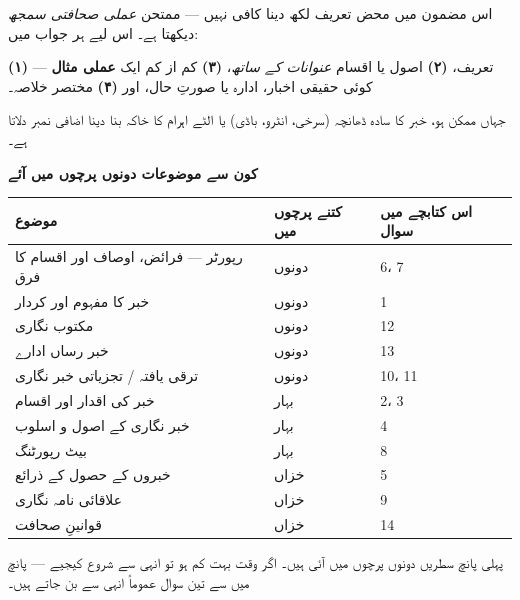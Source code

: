 \medskip
\begin{nukta}
اس مضمون میں محض تعریف لکھ دینا کافی نہیں --- ممتحن \emph{عملی صحافتی سمجھ}
دیکھتا ہے۔ اس لیے ہر جواب میں:

\smallskip
\textbf{(۱)} تعریف، \textbf{(۲)} اصول یا اقسام \emph{عنوانات کے ساتھ}،
\textbf{(۳)} کم از کم ایک \textbf{عملی مثال} --- کوئی حقیقی اخبار، ادارہ یا
صورتِ حال، اور \textbf{(۴)} مختصر خلاصہ۔

\smallskip
جہاں ممکن ہو، خبر کا سادہ ڈھانچہ (سرخی، انٹرو، باڈی) یا الٹے اہرام کا خاکہ بنا
دینا اضافی نمبر دلاتا ہے۔
\end{nukta}

\medskip
\noindent
\textbf{\color{bmblue}کون سے موضوعات دونوں پرچوں میں آئے}

\medskip
\begin{center}
\begin{tabular}{@{}p{6.6cm} p{2.6cm} p{5.2cm}@{}}
\toprule
\textbf{موضوع} & \textbf{کتنے پرچوں میں} & \textbf{اس کتابچے میں سوال} \\
\midrule
رپورٹر --- فرائض، اوصاف اور اقسام کا فرق & دونوں & \textenglish{6}، \textenglish{7} \\
خبر کا مفہوم اور کردار                    & دونوں & \textenglish{1} \\
مکتوب نگاری                                & دونوں & \textenglish{12} \\
خبر رساں ادارے                             & دونوں & \textenglish{13} \\
ترقی یافتہ / تجزیاتی خبر نگاری             & دونوں & \textenglish{10}، \textenglish{11} \\
خبر کی اقدار اور اقسام                     & بہار  & \textenglish{2}، \textenglish{3} \\
خبر نگاری کے اصول و اسلوب                  & بہار  & \textenglish{4} \\
بیٹ رپورٹنگ                                 & بہار  & \textenglish{8} \\
خبروں کے حصول کے ذرائع                     & خزاں  & \textenglish{5} \\
علاقائی نامہ نگاری                          & خزاں  & \textenglish{9} \\
قوانینِ صحافت                               & خزاں  & \textenglish{14} \\
\bottomrule
\end{tabular}
\end{center}

\medskip
\noindent
پہلی پانچ سطریں دونوں پرچوں میں آئی ہیں۔ اگر وقت بہت کم ہو تو انہی سے شروع
کیجیے --- پانچ میں سے تین سوال عموماً انہی سے بن جاتے ہیں۔
